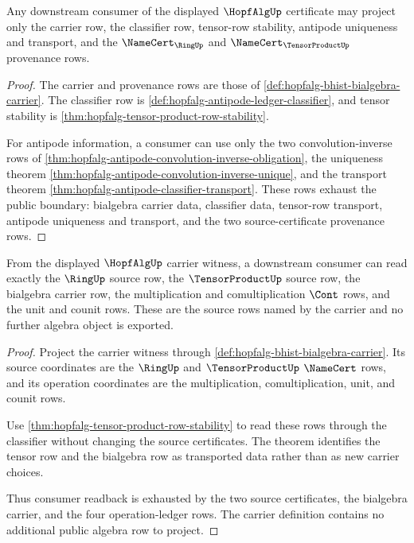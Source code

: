\begin{theorem}
\label{thm:hopfalg-consumer-boundary-obligation}
Any downstream consumer of the displayed $\HopfAlgUp$ certificate may project
only the carrier row, the classifier row, tensor-row stability, antipode
uniqueness and transport, and the $\NameCert_{\RingUp}$ and
$\NameCert_{\TensorProductUp}$ provenance rows.
\end{theorem}
\begin{proof}
The carrier and provenance rows are those of
\autoref{def:hopfalg-bhist-bialgebra-carrier}. The classifier row is
\autoref{def:hopfalg-antipode-ledger-classifier}, and tensor stability is
\autoref{thm:hopfalg-tensor-product-row-stability}.

For antipode information, a consumer can use only the two convolution-inverse
rows of \autoref{thm:hopfalg-antipode-convolution-inverse-obligation}, the
uniqueness theorem \autoref{thm:hopfalg-antipode-convolution-inverse-unique},
and the transport theorem \autoref{thm:hopfalg-antipode-classifier-transport}.
These rows exhaust the public boundary: bialgebra carrier data, classifier
data, tensor-row transport, antipode uniqueness and transport, and the two
source-certificate provenance rows.
\end{proof}

\begin{theorem}
\label{thm:hopfalg-bialgebra-source-consumer-readback}
From the displayed $\HopfAlgUp$ carrier witness, a downstream consumer can
read exactly the $\RingUp$ source row, the $\TensorProductUp$ source row, the
bialgebra carrier row, the multiplication and comultiplication $\Cont$ rows,
and the unit and counit rows. These are the source rows named by the carrier
and no further algebra object is exported.
\end{theorem}
\begin{proof}
Project the carrier witness through
\autoref{def:hopfalg-bhist-bialgebra-carrier}. Its source coordinates are the
$\RingUp$ and $\TensorProductUp$ $\NameCert$ rows, and its operation
coordinates are the multiplication, comultiplication, unit, and counit rows.

Use \autoref{thm:hopfalg-tensor-product-row-stability} to read these rows
through the classifier without changing the source certificates. The theorem
identifies the tensor row and the bialgebra row as transported data rather
than as new carrier choices.

Thus consumer readback is exhausted by the two source certificates, the
bialgebra carrier, and the four operation-ledger rows. The carrier definition
contains no additional public algebra row to project.
\end{proof}

